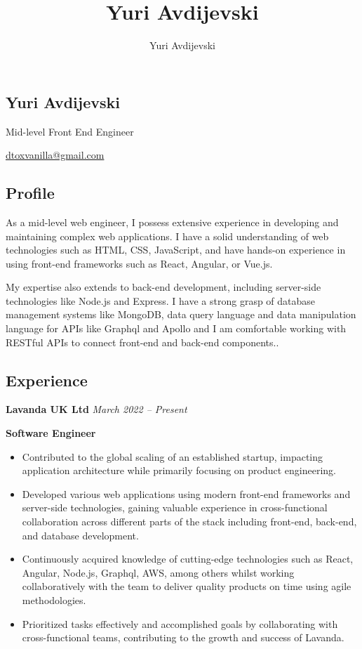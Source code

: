 \documentclass[11pt, oneside]{article}
\title{Yuri Avdijevski}
\author{Yuri Avdijevski}
\begin{document}
\begin{center}
\section*{Yuri Avdijevski}
Mid-level Front End Engineer

\href{dtoxvanilla@gmail.com}{dtoxvanilla@gmail.com}
\end{center}

\subsection*{Profile}

As a mid-level web engineer, I possess extensive experience in developing and maintaining complex web applications. I have a solid understanding of web technologies such as HTML, CSS, JavaScript, and have hands-on experience in using front-end frameworks such as React, Angular, or Vue.js.

My expertise also extends to back-end development, including server-side technologies like Node.js and Express. I have a strong grasp of database management systems like MongoDB, data query language and data manipulation language for APIs like Graphql and Apollo and I am comfortable working with RESTful APIs to connect front-end and back-end components..

\medskip
\subsection*{Experience}

\textbf{Lavanda UK Ltd}
\hfill
\textit{March 2022 – Present}

\textbf{Software Engineer}

\begin{itemize}
  \item Contributed to the global scaling of an established startup, impacting application architecture while primarily focusing on product engineering.
  \item Developed various web applications using modern front-end frameworks and server-side technologies, gaining valuable experience in cross-functional collaboration across different parts of the stack including front-end, back-end, and database development.
  \item Continuously acquired knowledge of cutting-edge technologies such as React, Angular, Node.js, Graphql, AWS, among others whilst working collaboratively with the team to deliver quality products on time using agile methodologies.
  \item Prioritized tasks effectively and accomplished goals by collaborating with cross-functional teams, contributing to the growth and success of Lavanda.
\end{itemize}
\end{document}
